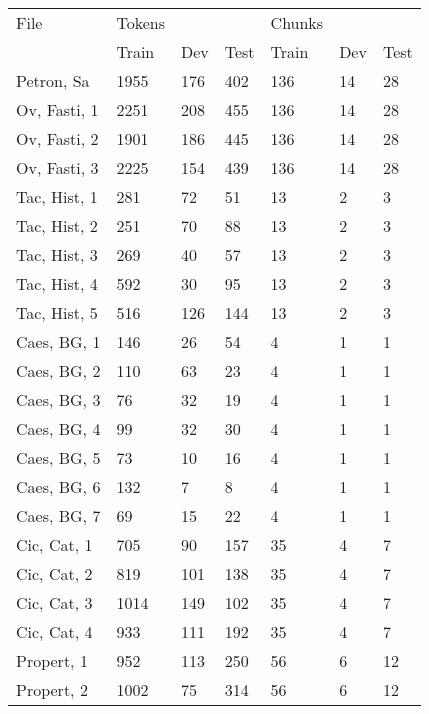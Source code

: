 \begin{table}[]
\centering
\begin{tabular}{l|lll|lll}
\toprule
 File         & Tokens &      &      & Chunks &     &      \\
              & Train  & Dev  & Test & Train  & Dev & Test \\ \midrule
 Petron, Sa   & 1955   & 176  & 402  & 136    & 14  & 28   \\
 Ov, Fasti, 1 & 2251   & 208  & 455  & 136    & 14  & 28   \\
 Ov, Fasti, 2 & 1901   & 186  & 445  & 136    & 14  & 28   \\
 Ov, Fasti, 3 & 2225   & 154  & 439  & 136    & 14  & 28   \\
 Tac, Hist, 1 & 281    & 72   & 51   & 13     & 2   & 3    \\
 Tac, Hist, 2 & 251    & 70   & 88   & 13     & 2   & 3    \\
 Tac, Hist, 3 & 269    & 40   & 57   & 13     & 2   & 3    \\
 Tac, Hist, 4 & 592    & 30   & 95   & 13     & 2   & 3    \\
 Tac, Hist, 5 & 516    & 126  & 144  & 13     & 2   & 3    \\
 Caes, BG, 1  & 146    & 26   & 54   & 4      & 1   & 1    \\
 Caes, BG, 2  & 110    & 63   & 23   & 4      & 1   & 1    \\
 Caes, BG, 3  & 76     & 32   & 19   & 4      & 1   & 1    \\
 Caes, BG, 4  & 99     & 32   & 30   & 4      & 1   & 1    \\
 Caes, BG, 5  & 73     & 10   & 16   & 4      & 1   & 1    \\
 Caes, BG, 6  & 132    & 7    & 8    & 4      & 1   & 1    \\
 Caes, BG, 7  & 69     & 15   & 22   & 4      & 1   & 1    \\
 Cic, Cat, 1  & 705    & 90   & 157  & 35     & 4   & 7    \\
 Cic, Cat, 2  & 819    & 101  & 138  & 35     & 4   & 7    \\
 Cic, Cat, 3  & 1014   & 149  & 102  & 35     & 4   & 7    \\
 Cic, Cat, 4  & 933    & 111  & 192  & 35     & 4   & 7    \\
 Propert, 1   & 952    & 113  & 250  & 56     & 6   & 12   \\
 Propert, 2   & 1002   & 75   & 314  & 56     & 6   & 12   \\

\end{tabular}
\end{table}
